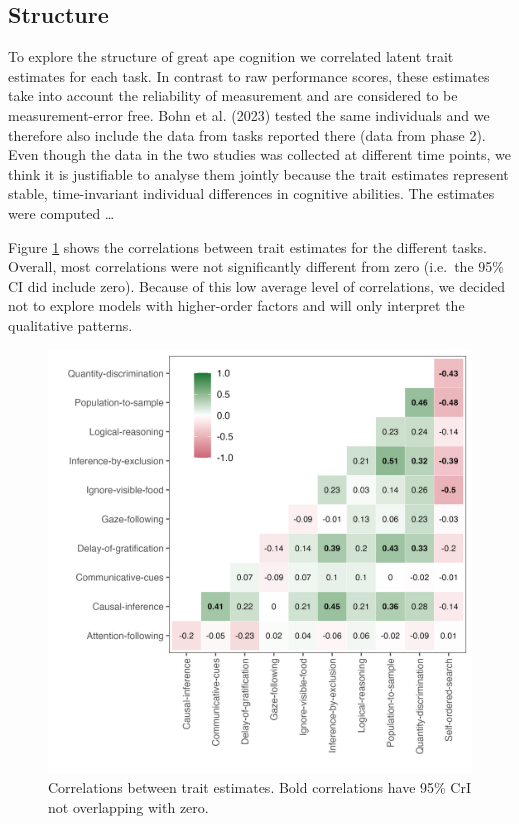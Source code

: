 \documentclass[
  man,floatsintext]{apa6}
\begin{document}
\hypertarget{structure}{%
\subsection{Structure}\label{structure}}

To explore the structure of great ape cognition we correlated latent trait estimates for each task. In contrast to raw performance scores, these estimates take into account the reliability of measurement and are considered to be measurement-error free. Bohn et al. (2023) tested the same individuals and we therefore also include the data from tasks reported there (data from phase 2). Even though the data in the two studies was collected at different time points, we think it is justifiable to analyse them jointly because the trait estimates represent stable, time-invariant individual differences in cognitive abilities. The estimates were computed \ldots{}

Figure \ref{fig:figcor} shows the correlations between trait estimates for the different tasks. Overall, most correlations were not significantly different from zero (i.e.~the 95\% CI did include zero). Because of this low average level of correlations, we decided not to explore models with higher-order factors and will only interpret the qualitative patterns.

\begin{figure}

{\centering \includegraphics[width=0.7\linewidth]{../visuals/task_level_cor} 

}

\caption{Correlations between trait estimates. Bold correlations have 95\% CrI not overlapping with zero.}\label{fig:figcor}
\end{figure}
\end{document}
